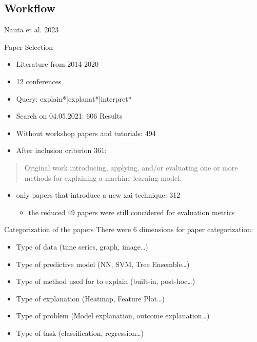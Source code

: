 \documentclass[presentation]{beamer}
\begin{document}
  \subsection{Workflow}

\begin{frame}[label={sec:org030fe25}]{Nauta et al. 2023}
\begin{block}{Paper Selection}
\begin{itemize}
\item Literature from 2014-2020
\item 12 conferences
\item Query: explain*|explanat*|interpret*
\item Search on 04.05.2021: 606 Results
\item Without workshop papers and tutorials: 494
\item After inclusion criterion 361:
\end{itemize}
\begin{quote}
Original work introducing, applying, and/or evaluating one or more methods for explaining a machine
learning model.
\end{quote}
\begin{itemize}
\item only papers that introduce a new xai technique: 312
\begin{itemize}
\item the reduced 49 papers were still concidered for evaluation metrics
\end{itemize}
\end{itemize}
\end{block}
\end{frame}
\begin{frame}
\begin{block}{Categorization of the papers}
There were 6 dimensions for paper categorization:
\begin{itemize}
\item Type of data (time series, graph, image\ldots{})
\item Type of predictive model (NN, SVM, Tree Ensemble\ldots{})
\item Type of method used for to explain (built-in, post-hoc\ldots{})
\item Type of explanation (Heatmap, Feature Plot\ldots{})
\item Type of problem (Model explanation, outcome explanation\ldots{})
\item Type of task (classification, regression\ldots{})
\end{itemize}
\end{block}
\end{frame}
\end{document}

